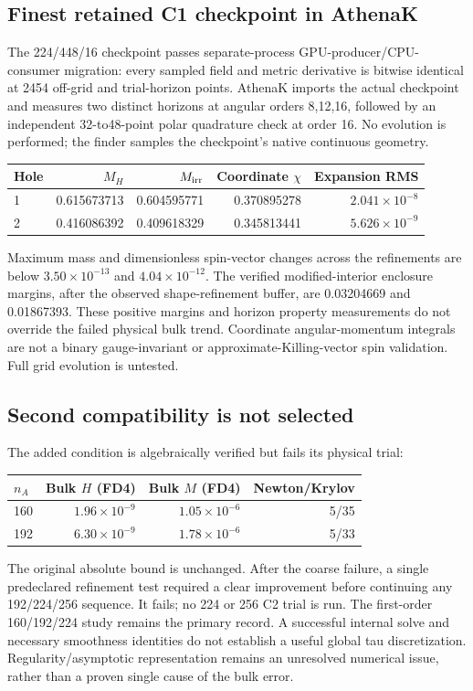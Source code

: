 \documentclass[aps,prd,preprint,notitlepage,nofootinbib]{revtex4-2}
\begin{document}
\subsection{Finest retained C1 checkpoint in AthenaK}
The 224/448/16 checkpoint passes separate-process GPU-producer/CPU-consumer
migration: every sampled field and metric derivative is bitwise identical
at 2454 off-grid and trial-horizon points. AthenaK imports the actual checkpoint
and measures two distinct horizons at angular orders 8,12,16, followed by an
independent 32-to48-point polar quadrature check at order 16. No evolution is
performed; the finder samples the checkpoint's native continuous geometry.
\begin{center}\footnotesize
\begin{tabular}{@{}lrrrr@{}}\toprule
Hole & $M_H$ & $M_{\rm irr}$ & Coordinate $\chi$ & Expansion RMS\\\midrule
1 & 0.615673713 & 0.604595771 & 0.370895278 & $2.041\times10^{-8}$\\
2 & 0.416086392 & 0.409618329 & 0.345813441 & $5.626\times10^{-9}$\\
\bottomrule\end{tabular}\end{center}
Maximum mass and dimensionless spin-vector changes across the refinements
are below $3.50\times10^{-13}$ and $4.04\times10^{-12}$. The verified
modified-interior enclosure margins, after the observed shape-refinement
buffer, are 0.03204669 and 0.01867393. These positive margins and horizon
property measurements do not override the failed physical bulk trend.
Coordinate angular-momentum integrals are not a binary gauge-invariant or
approximate-Killing-vector spin validation. Full grid evolution is untested.

\subsection{Second compatibility is not selected}
The added condition is algebraically verified but fails its physical trial:
\begin{center}\footnotesize
\begin{tabular}{@{}lrrr@{}}\toprule
$n_A$ & Bulk $H$ (FD4) & Bulk $M$ (FD4) & Newton/Krylov\\\midrule
160 & $1.96\times10^{-9}$ & $1.05\times10^{-6}$ &5/35\\
192 & $6.30\times10^{-9}$ & $1.78\times10^{-6}$ &5/33\\\bottomrule
\end{tabular}\end{center}
The original absolute bound is unchanged. After the coarse failure, a single
predeclared refinement test required a clear improvement before continuing
any 192/224/256 sequence. It fails; no 224 or 256 C2 trial is run. The first-order
160/192/224 study remains the primary record. A successful internal solve and
necessary smoothness identities do not establish a useful global tau
discretization. Regularity/asymptotic representation remains an unresolved
numerical issue, rather than a proven single cause of the bulk error.
\end{document}
